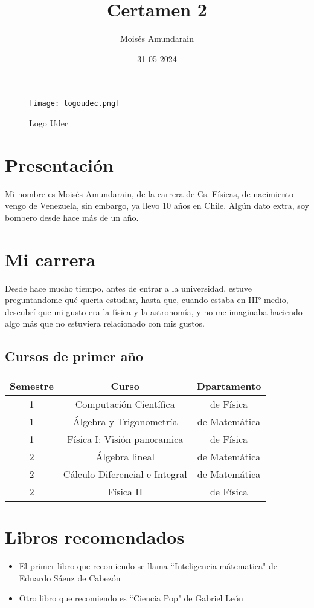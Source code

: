 \documentclass[12pt]{article}
\begin{document}
\author{Moisés Amundarain}
\date{31-05-2024}
\title{Certamen 2}
\maketitle
\begin{figure}
	\begin{center}		\texttt{[image: logoudec.png]}
	\caption{Logo Udec}
	\end{center}
  \label{logoudec}
\end{figure}
\newpage
\section{Presentación}
Mi nombre es Moisés Amundarain, de la carrera de Cs. Físicas, de nacimiento vengo de Venezuela, sin embargo, ya llevo 10 años en Chile. Algún dato extra, soy bombero desde hace más de un año.
\section{Mi carrera}
Desde hace mucho tiempo, antes de entrar a la universidad, estuve preguntandome qué queria estudiar, hasta que, cuando estaba en III° medio, descubrí que mi gusto era la física y la astronomía, y no me imaginaba haciendo algo más que no estuviera relacionado con mis gustos.
\subsection{Cursos de primer año}
\begin{center}
	\begin{tabular}{c|c|c}
		Semestre & Curso & Dpartamento \\ \hline
		1 & Computación Científica & de Física \\ 
		1 & Álgebra y Trigonometría & de Matemática \\
		1 & Física I: Visión panoramica & de Física \\ 
		2 & Álgebra lineal & de Matemática \\
		2 & Cálculo Diferencial e Integral & de Matemática \\ 
		2 & Física II & de Física
	\end{tabular}
\end{center}
\section{Libros recomendados}
	\begin{itemize}
		\item El primer libro que recomiendo se llama ``Inteligencia mátematica" de Eduardo Sáenz de Cabezón \cite{libro1}
		\item Otro libro que recomiendo es ``Ciencia Pop"  de Gabriel León \cite{libro2}
	\end{itemize}
\newpage
\end{document}
